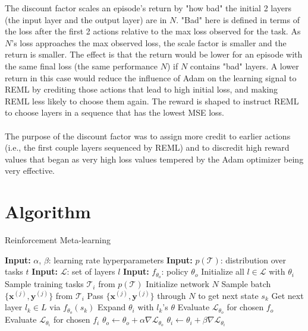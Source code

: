 The discount factor scales an episode's return by "how bad" the 
initial 2 layers (the input layer and the output layer) are in $N$. "Bad" here is 
defined in terms of the loss after the first 2 actions relative to the max 
loss observed for the task. 
As $N$'s loss approaches the max observed loss, the scale factor is smaller and 
the return is smaller.
The effect is that the return would be lower for an episode with the same final 
loss (the same performance $N$) if $N$ contains "bad" layers. A lower return in this 
case would reduce the influence of Adam on the learning signal to REML by 
crediting those actions that lead to high initial loss, and making REML less likely 
to choose them again. The reward is shaped to instruct REML to choose layers 
in a sequence that has the lowest MSE loss.
\\\\
The purpose of the discount factor was to assign more credit to earlier actions 
(i.e., the first couple layers sequenced by REML) and to discredit high reward 
values that began as very high loss values tempered by the Adam optimizer being 
very effective.

\section{Algorithm}
\begin{algorithm}
\caption{Reinforcement Meta-learning}\label{alg:cap}
\begin{algorithmic}
\State \textbf{Input:} $\alpha$, $\beta$: learning rate hyperparameters
\State \textbf{Input:} $p(\mathcal{T})$: distribution over tasks $t$ 
\State \textbf{Input:} $\mathcal{L}$: set of layers $l$
\State \textbf{Input:} $f_{\theta_{o}}$: policy $\theta_{o}$
\State Initialize all $l \in \mathcal{L}$ with $\theta_{i}$
\State Sample training tasks $\mathcal{T}_i$ from $p(\mathcal{T})$
\State Initialize network $N$ 
\State Sample batch $\{\mathbf{x}^{(j)}, \mathbf{y}^{(j)}\}$ from $\mathcal{T}_{i}$
\State Pass $\{\mathbf{x}^{(j)}, \mathbf{y}^{(j)}\}$ through $N$ to get next state $s_k$ 
\State Get next layer $l_k \in L$ via $f_{\theta_{o}}(s_k)$
\State Expand $\theta_{i}$ with $l_k$'s $\theta$
\State Evaluate $\mathcal{L}_{\theta_{o}}$ for chosen $f_{o}$ 
\State Evaluate $\mathcal{L}_{\theta_{i}}$ for chosen $f_{i}$ 
\State $\theta_{o} \leftarrow \theta_{o} + \alpha \nabla \mathcal{L}_{\theta_{o}}$ 
\State $\theta_{i} \leftarrow \theta_{i} + \beta \nabla \mathcal{L}_{\theta_{i}}$ 
\EndWhile
\EndFor
\end{algorithmic}
\end{algorithm}

